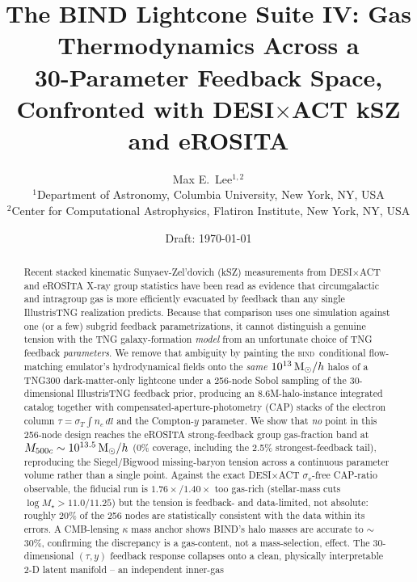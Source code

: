 \documentclass[11pt]{article}
\title{The BIND Lightcone Suite IV: Gas Thermodynamics Across a\\
30-Parameter Feedback Space, Confronted with DESI$\times$ACT kSZ and eROSITA}
\author{%
  Max E.\ Lee$^{1,2}$ \todo{author list to be finalized}\\[2pt]
  \small $^1$Department of Astronomy, Columbia University, New York, NY, USA\\
  \small $^2$Center for Computational Astrophysics, Flatiron Institute, New York, NY, USA
}
\date{Draft: \today}
\newcommand{\bind}{\textsc{bind}}
\newcommand{\Msun}{{\rm M}_\odot}
\newcommand{\Mfive}{M_{500c}}
\begin{document}
\maketitle

\begin{abstract}
Recent stacked kinematic Sunyaev-Zel'dovich (kSZ) measurements from DESI$\times$ACT
and eROSITA X-ray group statistics have been read as evidence that circumgalactic
and intragroup gas is more efficiently evacuated by feedback than any single
IllustrisTNG realization predicts. Because that comparison uses one simulation
against one (or a few) subgrid feedback parametrizations, it cannot distinguish
a genuine tension with the TNG galaxy-formation \emph{model} from an
unfortunate choice of TNG feedback \emph{parameters}. We remove that ambiguity
by painting the \bind\ conditional flow-matching emulator's hydrodynamical
fields onto the \emph{same} $10^{13}\,\Msun/h$ halos of a TNG300 dark-matter-only
lightcone under a 256-node Sobol sampling of the 30-dimensional IllustrisTNG
feedback prior, producing an 8.6M-halo-instance integrated catalog together with
compensated-aperture-photometry (CAP) stacks of the electron column
$\tau=\sigma_T\!\int n_e\,dl$ and the Compton-$y$ parameter. %
We show that
\emph{no} point in this 256-node design reaches the eROSITA strong-feedback
group gas-fraction band at $\Mfive\sim10^{13.5}\,\Msun/h$ (0\% coverage, including the
2.5\% strongest-feedback tail), reproducing the Siegel/Bigwood missing-baryon
tension across a continuous parameter volume rather than a single point. %
Against
the exact DESI$\times$ACT $\sigma_v$-free CAP-ratio observable, the fiducial run
is $1.76\times$/$1.40\times$ too gas-rich (stellar-mass cuts $\log M_\star{>}11.0/11.25$)
but the tension is feedback- and data-limited, not absolute: roughly 20\% of the
256 nodes are statistically consistent with the data within its errors. %
A
CMB-lensing $\kappa$ mass anchor shows BIND's halo masses are accurate to
$\sim$30\%, confirming the discrepancy is a gas-content, not a mass-selection,
effect. %
The 30-dimensional $(\tau,y)$ feedback response collapses onto a clean,
physically interpretable 2-D latent manifold -- an independent inner-gas

\end{abstract}
\end{document}
